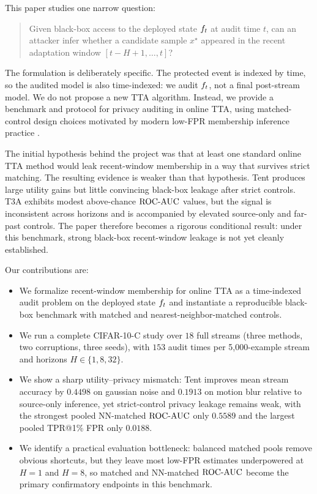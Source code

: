 This paper studies one narrow question:
\begin{quote}
Given black-box access to the deployed state $f_t$ at audit time $t$, can an attacker infer whether a candidate sample $x^\star$ appeared in the recent adaptation window $[t-H+1,\ldots,t]$?
\end{quote}
The formulation is deliberately specific. The protected event is indexed by time, so the audited model is also time-indexed: we audit $f_t$, not a final post-stream model. We do not propose a new TTA algorithm. Instead, we provide a benchmark and protocol for privacy auditing in online TTA, using matched-control design choices motivated by modern low-FPR membership inference practice \citep{carlini2022lira,wang2025reliability}.

The initial hypothesis behind the project was that at least one standard online TTA method would leak recent-window membership in a way that survives strict matching. The resulting evidence is weaker than that hypothesis. Tent produces large utility gains but little convincing black-box leakage after strict controls. T3A exhibits modest above-chance $\mathrm{ROC\mbox{-}AUC}$ values, but the signal is inconsistent across horizons and is accompanied by elevated source-only and far-past controls. The paper therefore becomes a rigorous conditional result: under this benchmark, strong black-box recent-window leakage is not yet cleanly established.

Our contributions are:
\begin{itemize}
  \item We formalize recent-window membership for online TTA as a time-indexed audit problem on the deployed state $f_t$ and instantiate a reproducible black-box benchmark with matched and nearest-neighbor-matched controls.
  \item We run a complete CIFAR-10-C study over $18$ full streams (three methods, two corruptions, three seeds), with $153$ audit times per 5{,}000-example stream and horizons $H \in \{1,8,32\}$.
  \item We show a sharp utility--privacy mismatch: Tent improves mean stream accuracy by $0.4498$ on gaussian noise and $0.1913$ on motion blur relative to source-only inference, yet strict-control privacy leakage remains weak, with the strongest pooled NN-matched $\mathrm{ROC\mbox{-}AUC}$ only $0.5589$ and the largest pooled TPR@1\% FPR only $0.0188$.
  \item We identify a practical evaluation bottleneck: balanced matched pools remove obvious shortcuts, but they leave most low-FPR estimates underpowered at $H{=}1$ and $H{=}8$, so matched and NN-matched $\mathrm{ROC\mbox{-}AUC}$ become the primary confirmatory endpoints in this benchmark.
\end{itemize}


